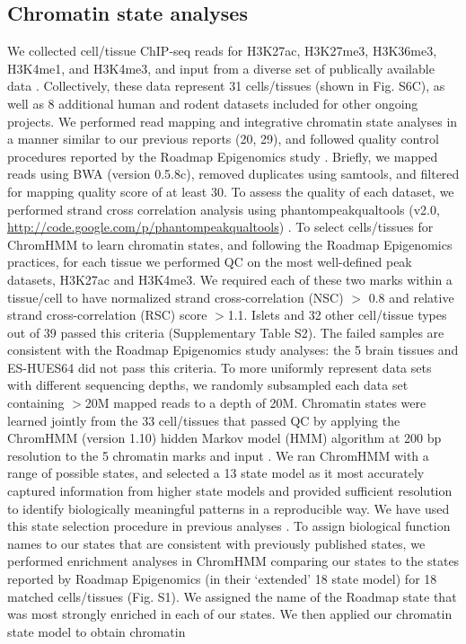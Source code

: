 \subsection{Chromatin state analyses}
We collected cell/tissue ChIP-seq reads for H3K27ac, H3K27me3, H3K36me3, H3K4me1, and H3K4me3, and input from a diverse set of publically available data \cite{consortiumIntegrativeAnalysis1112015, ernstMappingAnalysisChromatin2011, mikkelsenComparativeEpigenomicAnalysis2010, parkerChromatinStretchEnhancer2013}. Collectively, these data represent 31 cells/tissues (shown in Fig. S6C), as well as 8 additional human and rodent datasets included for other ongoing projects. We performed read mapping and integrative chromatin state analyses in a manner similar to our previous reports (20, 29), and followed quality control procedures reported by the Roadmap Epigenomics study \cite{consortiumIntegrativeAnalysis1112015}. Briefly, we mapped reads using BWA \cite{liFastAccurateShort2009a} (version 0.5.8c), removed duplicates using samtools, and filtered for mapping quality score of at least 30. To assess the quality of each dataset, we performed strand cross correlation analysis using phantompeakqualtools  (v2.0, \url{http://code.google.com/p/phantompeakqualtools}) \cite{consortiumIntegrativeAnalysis1112015}. To select cells/tissues for ChromHMM to learn chromatin states, and following the Roadmap Epigenomics practices, for each tissue we performed QC on the most well-defined peak datasets, H3K27ac and H3K4me3. We required each of these two marks within a tissue/cell to have normalized strand cross-correlation (NSC) $>$ 0.8 and relative strand cross-correlation (RSC) score $>$1.1. Islets and 32 other cell/tissue types out of 39 passed this criteria (Supplementary Table S2).  The failed samples are consistent with the Roadmap Epigenomics study analyses: the 5 brain tissues and ES-HUES64 did not pass this criteria. To more uniformly represent data sets with different sequencing depths, we randomly subsampled each data set containing $>$20M mapped reads to a depth of 20M. Chromatin states were learned jointly from the 33 cell/tissues that passed QC by applying the ChromHMM (version 1.10) hidden Markov model (HMM) algorithm at 200 bp resolution to the 5 chromatin marks and input \cite{ernstMappingAnalysisChromatin2011, ernstChromHMMAutomatingChromatin2012, ernstDiscoveryCharacterizationChromatin2010}. We ran ChromHMM with a range of possible states, and selected a 13 state model as it most accurately captured information from higher state models and provided sufficient resolution to identify biologically meaningful patterns in a reproducible way. We have used this state selection procedure in previous analyses \cite{scottGeneticRegulatorySignature2016, parkerChromatinStretchEnhancer2013}. To assign biological function names to our states that are consistent with previously published states, we performed enrichment analyses in ChromHMM comparing our states to the states reported by Roadmap Epigenomics (in their ‘extended’ 18 state model) \cite{consortiumIntegrativeAnalysis1112015} for 18 matched cells/tissues (Fig. S1). We assigned the name of the Roadmap state that was most strongly enriched in each of our states. We then applied our chromatin state model to obtain chromatin 